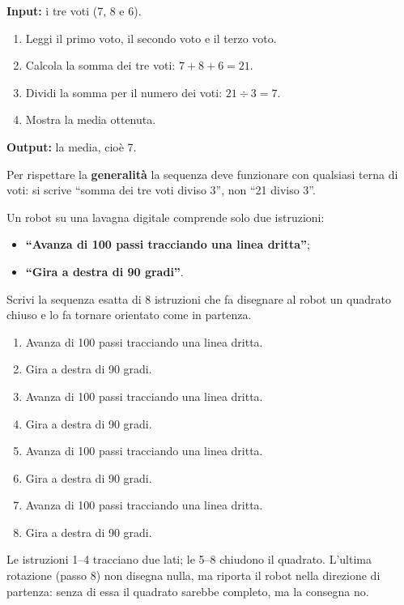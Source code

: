 \begin{soluzione}
\textbf{Input:} i tre voti (7, 8 e 6).
\begin{enumerate}
  \item Leggi il primo voto, il secondo voto e il terzo voto.
  \item Calcola la somma dei tre voti: $7 + 8 + 6 = 21$.
  \item Dividi la somma per il numero dei voti: $21 \div 3 = 7$.
  \item Mostra la media ottenuta.
\end{enumerate}
\textbf{Output:} la media, cioè 7.

\smallskip
\noindent Per rispettare la \textbf{generalità} la sequenza deve funzionare con qualsiasi terna di voti: si scrive ``somma dei tre voti diviso 3'', non ``21 diviso 3''.
\end{soluzione}

\begin{esercizio}
Un robot su una lavagna digitale comprende solo due istruzioni:
\begin{itemize}
  \item \textbf{``Avanza di 100 passi tracciando una linea dritta''};
  \item \textbf{``Gira a destra di 90 gradi''}.
\end{itemize}
Scrivi la sequenza esatta di 8 istruzioni che fa disegnare al robot un quadrato chiuso e lo fa tornare orientato come in partenza.
\end{esercizio}

\begin{soluzione}
\begin{enumerate}
  \item Avanza di 100 passi tracciando una linea dritta.
  \item Gira a destra di 90 gradi.
  \item Avanza di 100 passi tracciando una linea dritta.
  \item Gira a destra di 90 gradi.
  \item Avanza di 100 passi tracciando una linea dritta.
  \item Gira a destra di 90 gradi.
  \item Avanza di 100 passi tracciando una linea dritta.
  \item Gira a destra di 90 gradi.
\end{enumerate}
Le istruzioni 1--4 tracciano due lati; le 5--8 chiudono il quadrato. L'ultima rotazione (passo 8) non disegna nulla, ma riporta il robot nella direzione di partenza: senza di essa il quadrato sarebbe completo, ma la consegna no.
\end{soluzione}

